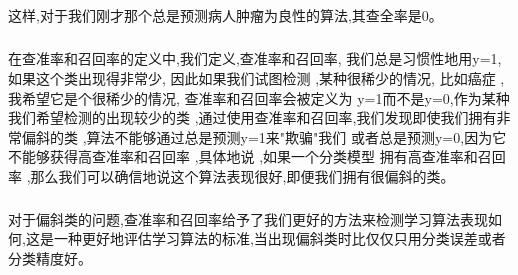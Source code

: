 \documentclass{article}
\begin{document}
\begin{CJK}{UTF8}{gbsn}
\begin{figure}[H]
\label{fig:686}
\end{figure}
\begin{figure}[H]
\label{fig:687}
\end{figure}
\begin{figure}[H]
\label{fig:688}
\end{figure}
\begin{figure}[H]
\label{fig:689}
\end{figure}
\subparagraph{}
这样,对于我们刚才那个总是预测病人肿瘤为良性的算法,其查全率是0。
\subparagraph{}
在查准率和召回率的定义中,我们定义,查准率和召回率, 我们总是习惯性地用y=1, 如果这个类出现得非常少, 因此如果我们试图检测 ,某种很稀少的情况, 比如癌症 ,我希望它是个很稀少的情况, 查准率和召回率会被定义为 y=1而不是y=0,作为某种我们希望检测的出现较少的类 ,通过使用查准率和召回率,我们发现即使我们拥有非常偏斜的类 ,算法不能够通过总是预测y=1来"欺骗"我们 或者总是预测y=0,因为它不能够获得高查准率和召回率 ,具体地说 ,如果一个分类模型 拥有高查准率和召回率 ,那么我们可以确信地说这个算法表现很好,即便我们拥有很偏斜的类。
\subparagraph{}
对于偏斜类的问题,查准率和召回率给予了我们更好的方法来检测学习算法表现如何,这是一种更好地评估学习算法的标准,当出现偏斜类时比仅仅只用分类误差或者分类精度好。 

\end{CJK}
\end{document}
